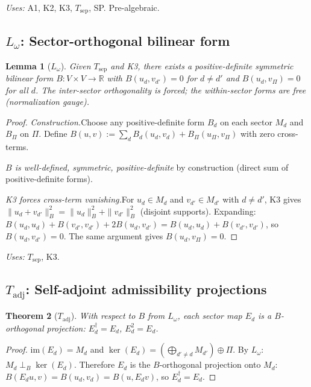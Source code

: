 \documentclass[11pt]{article}
\newtheorem{theorem_app}{Theorem}[section]
\newtheorem{lemma_app}[theorem_app]{Lemma}
\theoremstyle{definition}
\begin{document}
\noindent\textit{Uses:} A1, K2, K3, $T_{\mathrm{sep}}$, SP.
Pre-algebraic.


\subsection{$L_\omega$: Sector-orthogonal bilinear form}
\label{app:Lomega}

\begin{lemma_app}[$L_\omega$]
Given $T_{\mathrm{sep}}$ and K3, there exists a positive-definite
symmetric bilinear form $B: V \times V \to \mathbb{R}$ with
$B(u_d, v_{d'}) = 0$ for $d \ne d'$ and $B(u_d, v_\Pi) = 0$ for
all $d$.  The inter-sector orthogonality is forced; the within-sector
forms are free (normalization gauge).
\end{lemma_app}

\begin{proof}
\textit{Construction.}\quad Choose any positive-definite form $B_d$ on
each sector $M_d$ and $B_\Pi$ on $\Pi$.  Define
$B(u,v) := \sum_d B_d(u_d, v_d) + B_\Pi(u_\Pi, v_\Pi)$
with zero cross-terms.

\textit{$B$ is well-defined, symmetric, positive-definite} by
construction (direct sum of positive-definite forms).

\textit{K3 forces cross-term vanishing.}\quad For $u_d \in M_d$ and
$v_{d'} \in M_{d'}$ with $d \ne d'$, K3 gives
$\|u_d + v_{d'}\|_B^2 = \|u_d\|_B^2 + \|v_{d'}\|_B^2$ (disjoint
supports).  Expanding: $B(u_d, u_d) + B(v_{d'}, v_{d'}) +
2B(u_d, v_{d'}) = B(u_d, u_d) + B(v_{d'}, v_{d'})$, so
$B(u_d, v_{d'}) = 0$.  The same argument gives
$B(u_d, v_\Pi) = 0$.
\end{proof}

\noindent\textit{Uses:} $T_{\mathrm{sep}}$, K3.


\subsection{$T_{\mathrm{adj}}$: Self-adjoint admissibility projections}
\label{app:Tadj}

\begin{theorem_app}[$T_{\mathrm{adj}}$]
With respect to $B$ from $L_\omega$, each sector map $E_d$ is a
$B$-orthogonal projection: $E_d^\dagger = E_d$, $E_d^2 = E_d$.
\end{theorem_app}

\begin{proof}
$\mathrm{im}(E_d) = M_d$ and
$\ker(E_d) = (\bigoplus_{d' \ne d} M_{d'}) \oplus \Pi$.
By $L_\omega$: $M_d \perp_B \ker(E_d)$.  Therefore $E_d$ is the
$B$-orthogonal projection onto $M_d$:
$B(E_d u, v) = B(u_d, v_d) = B(u, E_d v)$, so $E_d^\dagger = E_d$.
\end{proof}
\end{document}
